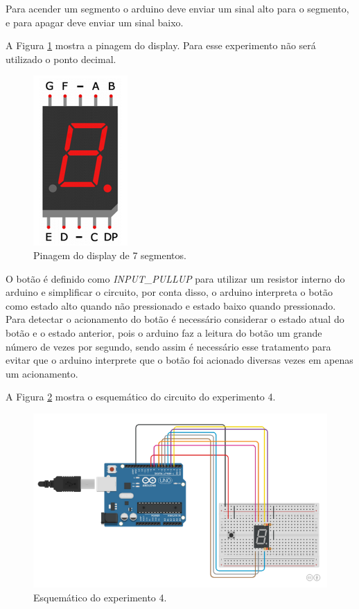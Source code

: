 \documentclass[12pt]{article}
\begin{document}
	Para acender um segmento o arduino deve enviar um sinal alto para o segmento, e para apagar deve enviar um sinal baixo.

	A Figura \ref{figPinosDisplay} mostra a pinagem do display. Para esse experimento não será utilizado o ponto decimal.

	\begin{figure}[H]
		\centering
		\includegraphics[scale=0.5]{Imagens/Experimentos/4-Display7Seg/pinosDisplay.png}
		\caption{Pinagem do display de 7 segmentos.}
		\label{figPinosDisplay}
	\end{figure}

	O botão é definido como \textit{INPUT\_PULLUP} para utilizar um resistor interno do arduino e simplificar o circuito, por conta disso, o arduino interpreta o botão como estado alto quando não pressionado e estado baixo quando pressionado. Para detectar o acionamento do botão é necessário considerar o estado atual do botão e o estado anterior, pois o arduino faz a leitura do botão um grande número de vezes por segundo, sendo assim é necessário esse tratamento para evitar que o arduino interprete que o botão foi acionado diversas vezes em apenas um acionamento.

	A Figura \ref{figExp4cod} mostra o esquemático do circuito do experimento 4.

	\begin{figure}[H]
		\centering
		\includegraphics[scale=0.3]{Imagens/Experimentos/4-Display7Seg/esquematico.png}
		\caption{Esquemático do experimento 4.}
		\label{figExp4cod}
	\end{figure}
\end{document}
